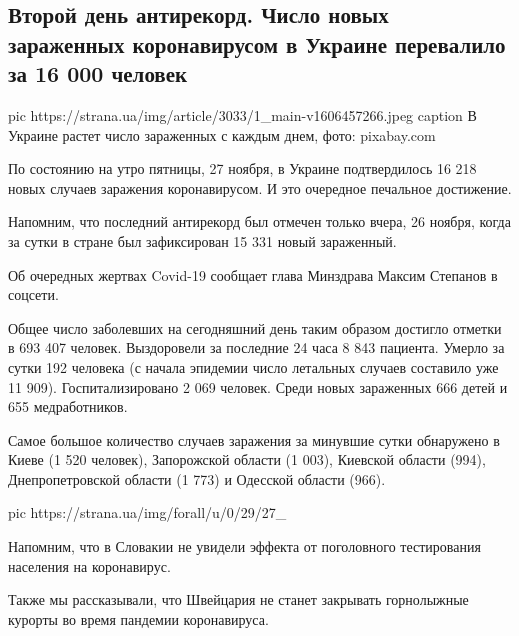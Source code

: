 
 
 
 
 
 
\subsection{Второй день антирекорд. Число новых зараженных коронавирусом в Украине перевалило за 16 000 человек}
\label{sec:27_11_2020.news.ua.strana.2.covid_16000_cases}

\ifcmt
	 pic https://strana.ua/img/article/3033/1_main-v1606457266.jpeg
	 caption В Украине растет число зараженных с каждым днем, фото: pixabay.com
\fi

По состоянию на утро пятницы, 27 ноября, в Украине подтвердилось 16 218 новых
случаев заражения коронавирусом. И это очередное печальное достижение.

Напомним, что последний антирекорд был отмечен только вчера, 26 ноября, когда
за сутки в стране был зафиксирован 15 331 новый зараженный.

Об очередных жертвах Covid-19 сообщает глава Минздрава Максим Степанов в
соцсети.

Общее число заболевших на сегодняшний день таким образом достигло отметки в 693
407 человек. Выздоровели за последние 24 часа 8 843 пациента. Умерло за сутки
192 человека (с начала эпидемии число летальных случаев составило уже 11 909).
Госпитализировано 2 069 человек. Среди новых зараженных 666 детей и 655
медработников.

Самое большое количество случаев заражения за минувшие сутки обнаружено в Киеве
(1 520 человек), Запорожской области (1 003), Киевской области (994),
Днепропетровской области (1 773) и Одесской области (966).


\ifcmt
	 pic https://strana.ua/img/forall/u/0/29/27_%
\fi

Напомним, что в Словакии не увидели эффекта от поголовного тестирования
населения на коронавирус.

Также мы рассказывали, что Швейцария не станет закрывать горнолыжные курорты во
время пандемии коронавируса.

